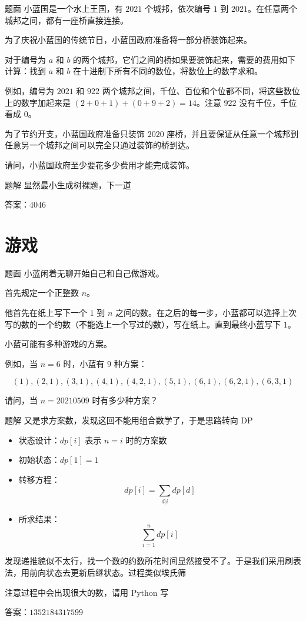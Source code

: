 \documentclass{pptt}
\begin{document}
\begin{frame}{题面}
    小蓝国是一个水上王国，有 $2021$ 个城邦，依次编号 $1$ 到 $2021$。在任意两个城邦之间，都有一座桥直接连接。

    为了庆祝小蓝国的传统节日，小蓝国政府准备将一部分桥装饰起来。

    对于编号为 $a$ 和 $b$ 的两个城邦，它们之间的桥如果要装饰起来，需要的费用如下计算：找到 $a$ 和 $b$ 在十进制下所有不同的数位，将数位上的数字求和。

    例如，编号为 $2021$ 和 $922$ 两个城邦之间，千位、百位和个位都不同，将这些数位上的数字加起来是 $(2+0+1)+(0+9+2)=14$。注意 $922$ 没有千位，千位看成 $0$。

    为了节约开支，小蓝国政府准备只装饰 $2020$ 座桥，并且要保证从任意一个城邦到任意另一个城邦之间可以完全只通过装饰的桥到达。

    请问，小蓝国政府至少要花多少费用才能完成装饰。
\end{frame}

\begin{frame}{题解}
    显然最小生成树裸题，下一道

    答案：$4046$
\end{frame}

\section{游戏}

\begin{frame}{题面}
    小蓝闲着无聊开始自己和自己做游戏。

    首先规定一个正整数 $n$。

    他首先在纸上写下一个 $1$ 到 $n$ 之间的数。在之后的每一步，小蓝都可以选择上次写的数的一个约数（不能选上一个写过的数），写在纸上。直到最终小蓝写下 $1$。

    小蓝可能有多种游戏的方案。

    例如，当 $n=6$ 时，小蓝有 $9$ 种方案：
    
    $$(1), (2,1), (3,1), (4,1), (4,2,1), (5,1), (6,1), (6,2,1), (6,3,1)$$

    请问，当 $n=20210509$ 时有多少种方案？
\end{frame}

\begin{frame}{题解}
    又是求方案数，发现这回不能用组合数学了，于是思路转向 DP

    \begin{itemize}
        \item 状态设计：$dp[i]$ 表示 $n=i$ 时的方案数
        \item 初始状态：$dp[1] = 1$
        \item 转移方程：$$dp[i] = \sum_{d|i} dp[d]$$
        \item 所求结果：$$\sum_{i=1}^{n} dp[i]$$
    \end{itemize}

    发现递推貌似不太行，找一个数的约数所花时间显然接受不了。于是我们采用刷表法，用前向状态去更新后继状态。过程类似埃氏筛

    注意过程中会出现很大的数，请用 Python 写

    答案：$1352184317599$
\end{frame}
\end{document}
